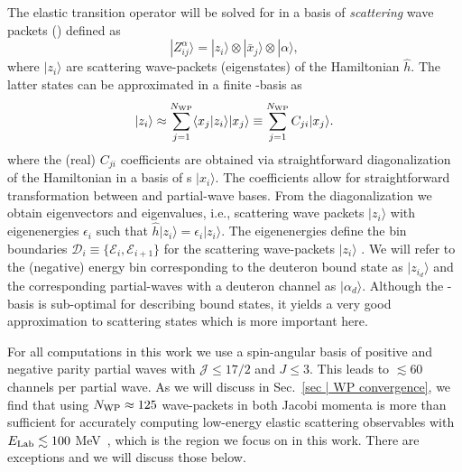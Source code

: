 \documentclass[aps,prc,showpacs,twocolumn,floatfix,nobibnotes,nofootinbib,amsmath,amssymb,longbibliography]{revtex4-2}
\begin{document}
The elastic transition operator will be solved for in a basis of
\NNN{} \textit{scattering} wave packets (\swp) defined as
\begin{equation}
  |Z^{\alpha}_{ij}\rangle = |z_i\rangle \otimes |\bar{x}_j\rangle \otimes |\alpha\rangle, 
\end{equation}
where $|z_i\rangle$ are scattering wave-packets (eigenstates) of the \NN{}
Hamiltonian $\hat{h}$. The latter states can be approximated in a
finite \fwp-basis as
\begin{equation}
  |z_i\rangle \approx \sum_{j=1}^{N_{\text{WP}}} \langle x_j|z_i\rangle|x_j\rangle \equiv \sum_{j=1}^{N_{\text{WP}}} C_{ji}|x_j\rangle.
  \label{eq | transformation coefficients}
\end{equation}
where the (real) $C_{ji}$ coefficients are obtained via
straightforward diagonalization of the \NN{} Hamiltonian in a basis of
\fwp s $|x_i\rangle$. The coefficients allow for straightforward
transformation between \fwp{} and \swp{} partial-wave bases. From the
diagonalization we obtain eigenvectors and eigenvalues, i.e.,
scattering wave packets $|z_i\rangle$ with eigenenergies $\epsilon_i$
such that $\hat{h}|z_i\rangle = \epsilon_i|z_i\rangle$. The
eigenenergies define the bin boundaries
$\mathcal{D}_i\equiv\{\mathcal{E}_i,\mathcal{E}_{i+1}\}$ for the
scattering wave-packets $|z_i\rangle$ \cite{Rubtsova:2015owa}. We will
refer to the (negative) energy bin corresponding to the deuteron bound
state as $|z_{i_d}\rangle$ and the corresponding \NNN{} partial-waves
with a deuteron channel as $|\alpha_d\rangle$. Although the \fwp-basis
is sub-optimal for describing bound states, it yields a very good
approximation to scattering states which is more important here.

For all computations in this work we use a spin-angular basis of
positive and negative parity \NNN{} partial waves with
$\mathcal{J}\leq 17/2$ and $J\leq 3$. This leads to $\lesssim 60$
channels per \NNN{} partial wave. As we will discuss in Sec.~\ref{sec
  | WP convergence}, we find that using $N_{\text{WP}}\approx 125$ wave-packets
in both Jacobi momenta is more than sufficient for accurately
computing low-energy elastic scattering observables with $E_\text{Lab}
\lesssim 100$ MeV~\cite{Gloeckle:1995jg}, which is the region we focus on in
this work. There are exceptions and we will discuss those below.
\end{document}
